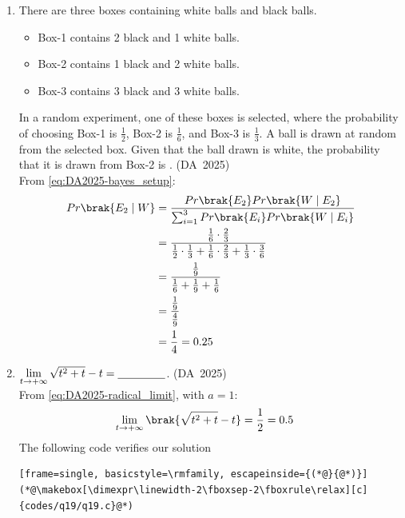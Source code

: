 \begin{enumerate}[label=\thesubsection.\arabic*, ref=\thesubsection.\theenumi]
	\item 
	There are three boxes containing white balls and black balls.
	\begin{itemize}
		\item Box-1 contains 2 black and 1 white balls.
		\item Box-2 contains 1 black and 2 white balls.
		\item Box-3 contains 3 black and 3 white balls.
	\end{itemize}
	In a random experiment, one of these boxes is selected, where the probability of choosing Box-1 is $\frac{1}{2}$, Box-2 is $\frac{1}{6}$, and Box-3 is $\frac{1}{3}$. A ball is drawn at random from the selected box. Given that the ball drawn is white, the probability that it is drawn from Box-2 is \underline{\hspace{1.5cm}}.
	\hfill (DA~2025)
	\\
	\solution
	From \eqref{eq:DA2025-bayes_setup}:
	\begin{align}
		Pr\brak{E_2 \mid W} &= \frac{Pr\brak{E_2}Pr\brak{W \mid E_2}}{\sum_{i=1}^3 Pr\brak{E_i}Pr\brak{W \mid E_i}}
		\\
		&= \frac{\frac{1}{6} \cdot \frac{2}{3}}{\frac{1}{2} \cdot \frac{1}{3} + \frac{1}{6} \cdot \frac{2}{3} + \frac{1}{3} \cdot \frac{3}{6}}
		\\
		&= \frac{\frac{1}{9}}{\frac{1}{6} + \frac{1}{9} + \frac{1}{6}}
		\\
		&= \frac{\frac{1}{9}}{\frac{4}{9}}
		\\
		&= \frac{1}{4} = 0.25
	\end{align}
	
	\item 
	$\lim\limits_{t \to +\infty} \sqrt{t^2 + t} - t = \underline{\hspace{1.5cm}}$.
	\hfill (DA~2025)
	\\
	\solution
	From \eqref{eq:DA2025-radical_limit}, with $a = 1$:
	\begin{align}
		\lim_{t \to +\infty} \brak{\sqrt{t^2 + t} - t} &= \frac{1}{2} = 0.5
	\end{align}
			The following code verifies our solution
	\begin{lstlisting}[frame=single, basicstyle=\rmfamily, escapeinside={(*@}{@*)}]
(*@\makebox[\dimexpr\linewidth-2\fboxsep-2\fboxrule\relax][c]{codes/q19/q19.c}@*)
	\end{lstlisting}
	

\end{enumerate}
